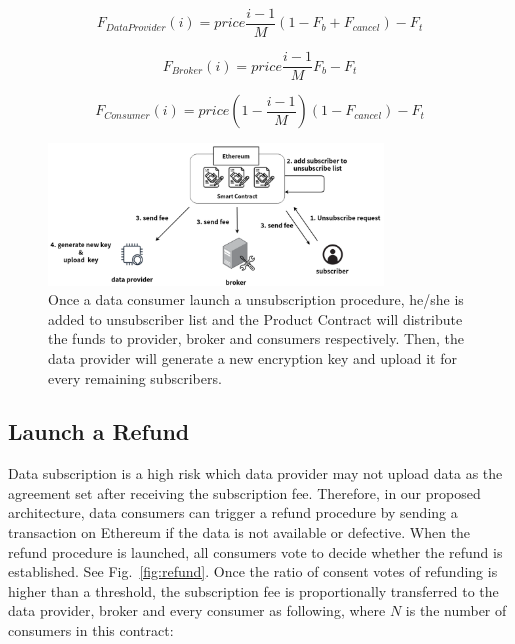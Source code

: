 \documentclass[conference]{IEEEtran}
\begin{document}
\begin{equation}
\label{equation:unsubscribe_provider}
    F_{DataProvider}(i) = price \frac{i-1}{M} (1-F_{b}+F_{cancel}) -F_{t} 
\end{equation}

\begin{equation}
\label{equation:unsubscribe_broker}
    F_{Broker}(i) = price \frac{i-1}{M} F_{b} -F_{t}
\end{equation}

\begin{equation}
\label{equation:unsubscribe_consumer}
    F_{Consumer}(i) = price (1-\frac{i-1}{M})(1 -F_{cancel}) -F_{t}
\end{equation}

\begin{figure}[h]
    \centering
    \includegraphics[width=3.5in]{unsubscribe}
    \caption{Once a data consumer launch a unsubscription procedure, he/she is added to unsubscriber list and the Product Contract will distribute the funds to provider, broker and consumers respectively. Then, the data provider will generate a new encryption key and upload it for every remaining subscribers.}
    \label{fig:unsubscribe}
\end{figure}

\subsection{Launch a Refund}
Data subscription is a high risk which data provider may not upload data as the agreement set after receiving the subscription fee. Therefore, in our proposed architecture, data consumers can trigger a refund procedure by sending a transaction on Ethereum if the data is not available or defective. When the refund procedure is launched, all consumers vote to decide whether the refund is established. See Fig.~\ref{fig:refund}. Once the ratio of consent votes of refunding is higher than a threshold, the subscription fee is proportionally transferred to the data provider, broker and every consumer as following, where $N$ is the number of consumers in this contract:
\end{document}
